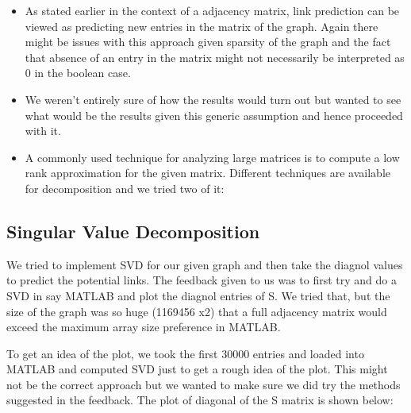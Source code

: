 \documentclass[letterpaper,twocolumn,11pt]{article}
\begin{document}
\begin{itemize}
\item As stated earlier in the context of a adjacency matrix, link prediction can be viewed as predicting new entries in the matrix of the graph. Again there might be issues with this approach given sparsity of the graph and the fact that absence of an entry in the matrix might not necessarily be interpreted as 0 in the boolean case. 

\item We weren't entirely sure of how the results would turn out but wanted to see what would be the results given this generic assumption and hence proceeded with it.

\item A commonly used technique for analyzing large matrices is to compute a low rank approximation for the given matrix. Different techniques are available for decomposition and we tried two of it:
\end{itemize}

\subsection{Singular Value Decomposition}

We tried to implement SVD for our given graph and then take the diagnol values to predict the potential links. The feedback given to us was to first try and do a SVD in say MATLAB and plot the diagnol entries of S. We tried that, but the size of the graph was so huge (1169456 x2) that a full adjacency matrix would exceed the maximum array size preference in MATLAB. 

To get an idea of the plot, we took the first 30000 entries and loaded into MATLAB and computed SVD just to get a rough idea of the plot. This might not be the correct approach but we wanted to make sure we did try the methods suggested in the feedback. The plot of diagonal  of the S matrix is shown below:
\end{document}
